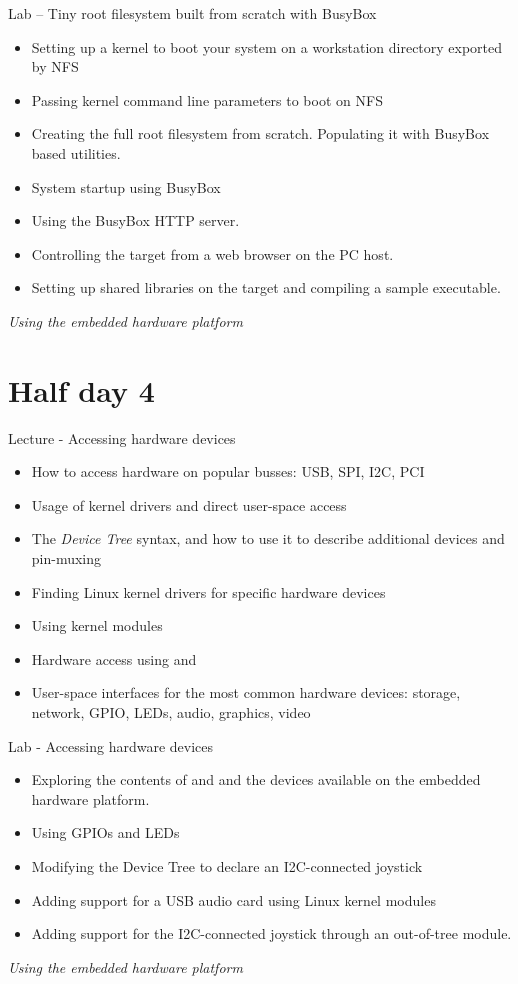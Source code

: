 \documentclass[a4paper,12pt,obeyspaces,spaces,hyphens]{article}
\begin{document}
\feagendaonecolumn
{Lab – Tiny root filesystem built from scratch with BusyBox}
{
  \begin{itemize}
  \item Setting up a kernel to boot your system on a workstation
    directory exported by NFS
  \item Passing kernel command line parameters to boot on NFS
  \item Creating the full root filesystem from scratch.
    Populating it with BusyBox based utilities.
  \item System startup using BusyBox 
  \item Using the BusyBox HTTP server.
  \item Controlling the target from a web browser on the PC host.
  \item Setting up shared libraries on the target and compiling
    a sample executable.
  \end{itemize}

  \vspace{0.5cm}
  {\em Using the embedded hardware platform}
}

\section{Half day 4}

\feagendatwocolumn
{Lecture - Accessing hardware devices}
{
  \begin{itemize}
  \item How to access hardware on popular busses: USB, SPI, I2C, PCI
  \item Usage of kernel drivers and direct user-space access
  \item The {\em Device Tree} syntax, and how to use it to describe
    additional devices and pin-muxing
  \item Finding Linux kernel drivers for specific hardware devices
  \item Using kernel modules
  \item Hardware access using  and 
  \item User-space interfaces for the most common hardware devices:
    storage, network, GPIO, LEDs, audio, graphics, video
  \end{itemize}
}
{Lab - Accessing hardware devices}
{
  \begin{itemize}
  \item Exploring the contents of  and  and the
    devices available on the embedded hardware platform.
  \item Using GPIOs and LEDs
  \item Modifying the Device Tree to declare an I2C-connected
        joystick
  \item Adding support for a USB audio card using Linux kernel modules
  \item Adding support for the I2C-connected joystick through
        an out-of-tree module.
  \end{itemize}

  \vspace{0.5cm}
  {\em Using the embedded hardware platform}
}
\end{document}
